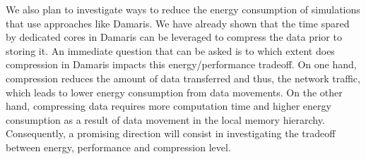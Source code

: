 %
We also plan to investigate ways to reduce the energy consumption  of simulations that use approaches like Damaris. We have already shown that the time spared by dedicated cores in Damaris can be leveraged to compress the data prior to storing it. An immediate question that can be asked is to which extent does compression in Damaris impacts this energy/performance tradeoff. On one hand, compression reduces the amount of data transferred and thus, the network traffic, which leads to lower energy consumption from data movements. On the other hand, compressing data requires more computation time and higher energy consumption as a result of data movement in the local memory hierarchy. Consequently, a promising direction will consist in investigating the tradeoff between energy, performance and compression level.
